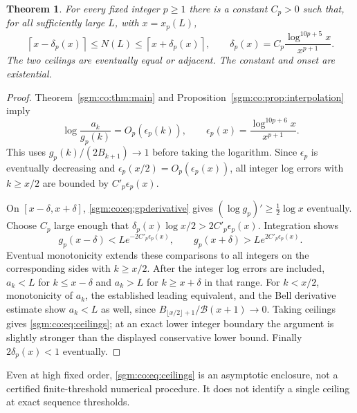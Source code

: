 \documentclass[11pt,letterpaper]{article}
\newtheorem{theorem}{Theorem}[section]
\theoremstyle{remark}\newtheorem{remark}[theorem]{Remark}
\theoremstyle{definition}\newtheorem{definition}[theorem]{Definition}
\begin{document}
\begin{theorem}\label{sgm:co:thm:inverse}
For every fixed integer $p\ge1$ there is a constant $C_p>0$ such that, for all sufficiently large $L$, with $x=x_p(L)$,
\begin{equation}\label{sgm:co:eq:ceilings}
 \left\lceil x-\delta_p(x)\right\rceil
 \le N(L)\le\left\lceil x+\delta_p(x)\right\rceil,
 \qquad \delta_p(x)=C_p\frac{\log^{10p+5}x}{x^{p+1}}.
\end{equation}
The two ceilings are eventually equal or adjacent. The constant and onset are existential.
\end{theorem}
\begin{proof}
Theorem~\ref{sgm:co:thm:main} and Proposition~\ref{sgm:co:prop:interpolation} imply
\[
 \log\frac{a_k}{g_p(k)}=O_p(\epsilon_p(k)),\qquad
 \epsilon_p(x)=\frac{\log^{10p+6}x}{x^{p+1}}.
\]
This uses $g_p(k)/(2B_{k+1})\to1$ before taking the logarithm. Since $\epsilon_p$ is eventually decreasing and $\epsilon_p(x/2)=O_p(\epsilon_p(x))$, all integer log errors with $k\ge x/2$ are bounded by $C'_p\epsilon_p(x)$.

On $[x-\delta,x+\delta]$, \eqref{sgm:co:eq:gpderivative} gives $(\log g_p)'\ge\tfrac12\log x$ eventually. Choose $C_p$ large enough that $\delta_p(x)\log x/2>2C'_p\epsilon_p(x)$. Integration shows
\[
 g_p(x-\delta)<Le^{-2C'_p\epsilon_p(x)},\qquad
 g_p(x+\delta)>Le^{2C'_p\epsilon_p(x)}.
\]
Eventual monotonicity extends these comparisons to all integers on the corresponding sides with $k\ge x/2$. After the integer log errors are included, $a_k<L$ for $k\le x-\delta$ and $a_k>L$ for $k\ge x+\delta$ in that range. For $k<x/2$, monotonicity of $a_k$, the established leading equivalent, and the Bell derivative estimate show $a_k<L$ as well, since $B_{\lfloor x/2\rfloor+1}/\mathcal B(x+1)\to0$. Taking ceilings gives \eqref{sgm:co:eq:ceilings}; at an exact lower integer boundary the argument is slightly stronger than the displayed conservative lower bound. Finally $2\delta_p(x)<1$ eventually.
\end{proof}
Even at high fixed order, \eqref{sgm:co:eq:ceilings} is an asymptotic enclosure, not a certified finite-threshold numerical procedure. It does not identify a single ceiling at exact sequence thresholds.
\end{document}
